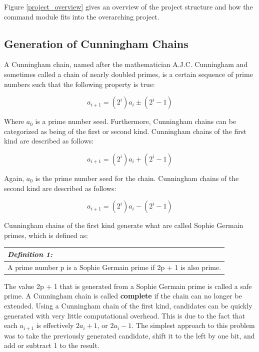 \documentclass[journal]{IEEEtran}
\begin{document}
Figure \ref{project_overview} gives an overview of the project structure and how the command module fits into the overarching project.

\subsection{Generation of Cunningham Chains}
A Cunningham chain, named after the mathematician A.J.C. Cunningham and sometimes called a chain of nearly doubled primes, is a certain sequence of prime numbers such that the following property is true:

\begin{displaymath}
	a_{i + 1} = (2^{i}) a_{i} \pm (2^{i} - 1)
\end{displaymath}

Where $a_{0}$ is a prime number seed. Furthermore, Cunningham chains can be categorized as being of the first or second kind. Cunningham chains of the first kind are described as follows:

\begin{displaymath}
	a_{i + 1} = (2^{i})a_{i} + (2^{i} - 1)
\end{displaymath}

Again, $a_{0}$ is the prime number seed for the chain. Cunningham chains of the second kind are described as follows:

\begin{displaymath}
	a_{i + 1} = (2^{i})a_{i} - (2^{i} - 1)
\end{displaymath}

Cunningham chains of the first kind generate what are called Sophie Germain primes, which is defined as:\\

\begin{tabular}{ p{3in} }
	\textit{Definition 1:} \\
	\hline
	A prime number p is a Sophie Germain prime if 2p + 1 is also prime. \\
	\hline
\end{tabular}

\vspace{2em}

The value 2p + 1 that is generated from a Sophie Germain prime is called a safe prime. A Cunningham chain is called \textbf{complete} if the chain can no longer be extended. Using a Cunningham chain of the first kind, candidates can be quickly generated with very little computational overhead. This is due to the fact that each $a_{i+1}$ is effectively $2a_{i} + 1$, or $2a_{i} - 1$. The simplest approach to this problem was to take the previously generated candidate, shift it to the left by one bit, and add or subtract 1 to the result.
\end{document}
